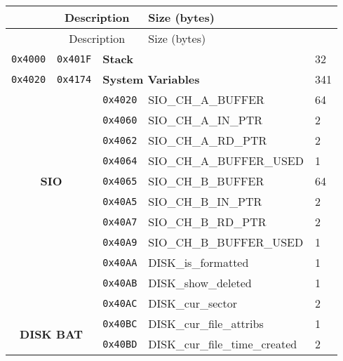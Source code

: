 \documentclass[a4paper,11pt]{article}
\begin{document}
    \begin{longtable}{ |l|l|l|l|l| }\hline
        \hline
        \rowcolor{lightgray}
        \multicolumn{2}{|c|}{Address} &
        \multicolumn{2}{|c|}{Description} &
        Size (bytes) \\
        \hline
        \hline
        \endfirsthead

        \hline
        \rowcolor{lightgray}
        \multicolumn{2}{|c|}{Address} &
        \multicolumn{2}{|c|}{Description} &
        Size (bytes) \\
        \hline
        \hline
        \endhead

        \texttt{0x4000} & \texttt{0x401F} & \multicolumn{2}{|l|}{\textbf{Stack}} & 32\\
        \hline
        \texttt{0x4020} & \texttt{0x4174} & \multicolumn{2}{|l|}{\textbf{System Variables}} & 341\\
        \hline
        \multicolumn{2}{|c|}{\multirow{9}{*}{\textbf{SIO}}} & \texttt{0x4020} & SIO\_CH\_A\_BUFFER & 64\\
        \multicolumn{2}{|c|}{} & \texttt{0x4060} & SIO\_CH\_A\_IN\_PTR & 2\\
        \multicolumn{2}{|c|}{} & \texttt{0x4062} & SIO\_CH\_A\_RD\_PTR & 2\\
        \multicolumn{2}{|c|}{} & \texttt{0x4064} & SIO\_CH\_A\_BUFFER\_USED & 1\\
        \multicolumn{2}{|c|}{} & \texttt{0x4065} & SIO\_CH\_B\_BUFFER & 64\\
        \multicolumn{2}{|c|}{} & \texttt{0x40A5} & SIO\_CH\_B\_IN\_PTR & 2\\
        \multicolumn{2}{|c|}{} & \texttt{0x40A7} & SIO\_CH\_B\_RD\_PTR & 2\\
        \multicolumn{2}{|c|}{} & \texttt{0x40A9} & SIO\_CH\_B\_BUFFER\_USED & 1\\
        \hline
        \multicolumn{2}{|c|}{\multirow{2}{*}{\textbf{DISK Superblock}}} & \texttt{0x40AA} & DISK\_is\_formatted & 1\\
        \multicolumn{2}{|c|}{} & \texttt{0x40AB} & DISK\_show\_deleted & 1\\
        \multicolumn{2}{|c|}{} & \texttt{0x40AC} & DISK\_cur\_sector & 2\\
        \hline
        \multicolumn{2}{|c|}{\multirow{11}{*}{\textbf{DISK BAT}}} & \texttt{0x40BC} & DISK\_cur\_file\_attribs & 1\\
        \multicolumn{2}{|c|}{} & \texttt{0x40BD} & DISK\_cur\_file\_time\_created & 2\\

\end{longtable}
\end{document}
